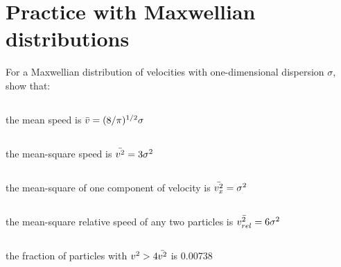 \section{Practice with Maxwellian distributions}

For a Maxwellian distribution of velocities with one-dimensional dispersion $\sigma$,
show that:

\subsection{}
the mean speed is $\Bar{v}=(8/\pi)^{1/2}\sigma$

\subsection{}
the mean-square speed is $\Bar{v^2}=3\sigma^2$

\subsection{}
the mean-square of one component of velocity is $\Bar{v^2_x}=\sigma^2$

\subsection{}
the mean-square relative speed of any two particles is $\Bar{v^2_{rel}}=6\sigma^2$

\subsection{}
the fraction of particles with $v^2>4\Bar{v^2}$ is 0.00738